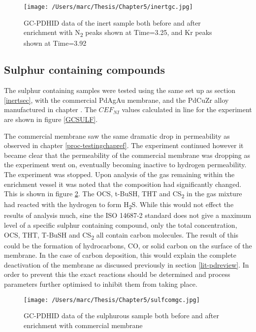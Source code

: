 \begin{figure}[H]
    \centering
    \texttt{[image: /Users/marc/Thesis/Chapter5/inertgc.jpg]}
    \caption{GC-PDHID data of the inert sample both before and after enrichment with N\textsubscript{2} peaks shown at Time=3.25, and Kr peaks shown at Time=3.92}
    \label{GCinert}
\end{figure}

\subsection{Sulphur containing compounds}
The sulphur containing samples were tested using the same set up as section \ref{inertsec}, with the commercial PdAgAu membrane, and the PdCuZr alloy manufactured in chapter \label{proc-testingchapref}. The $CEF_{NI}$ values calculated in line for the experiment are shown in figure \ref{GCSULF}.

The commercial membrane saw the same dramatic drop in permeability as observed in chapter \ref{proc-testingchapref}. The experiment continued however it became clear that the permeability of the commercial membrane was dropping as the experiment went on, eventually becoming inactive to hydrogen permeability. The experiment was stopped. Upon analysis of the gas remaining within the enrichment vessel it was noted that the composition had significantly changed. This is shown in figure \ref{GCSULFCOMM}. The OCS, t-BuSH, THT and CS\textsubscript{2} in the gas mixture had reacted with the hydrogen to form H\textsubscript{2}S. While this would not effect the results of analysis much, sine the ISO 14687-2 standard does not give a maximum level of a specific sulphur containing compound, only the total concentration, OCS, THT, T-BuSH and CS\textsubscript{2} all contain carbon molecules. The result of this could be the formation of hydrocarbons, CO, or solid carbon on the surface of the membrane. In the case of carbon deposition, this would explain the complete deactivation of the membrane as discussed previously in section \ref{lit-pdreview}. In order to prevent this the exact reactions should be determined and process parameters further optimised to inhibit them from taking place. 

\begin{figure}[H]
    \centering
    \texttt{[image: /Users/marc/Thesis/Chapter5/sulfcomgc.jpg]}
    \caption{GC-PDHID data of the sulphurous sample both before and after enrichment with commercial membrane}
    \label{GCSULFCOMM}
\end{figure}


